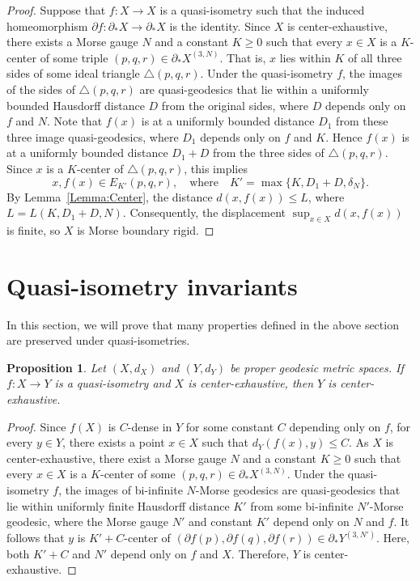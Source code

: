 \documentclass[a4paper,11pt,oneside]{article}
\newtheorem{Proposition}[Theorem]{Proposition}
\begin{document}
\begin{proof}
Suppose that $f: X\to X$ is a quasi-isometry such that the induced homeomorphism $\partial f:\partial_*X\to\partial_*X$ is the identity. 
Since $X$ is center-exhaustive, there exists a Morse gauge $N$ and a constant $K\ge0$ such that every $x\in X$ is a $K$-center of some triple $(p,q,r)\in\partial_*X^{(3, N)}$. That is, $x$ lies within $K$ of all three sides of some ideal triangle $\triangle(p, q, r)$. Under the quasi-isometry \( f \), the images of the sides of \( \triangle(p,q,r) \) are quasi-geodesics that lie within a uniformly bounded Hausdorff distance $D$ from the original sides, where $D$ depends only on $f$ and $N$.
Note that \( f(x) \) is at a uniformly bounded distance $D_1$ from these three image quasi-geodesics, where $D_1$ depends only on $f$ and $K$. Hence  \( f(x) \) is at a uniformly bounded distance $D_1+D$ from the three sides of \( \triangle(p,q,r) \). Since \( x \) is a \( K \)-center of \( \triangle(p,q,r) \), this implies 
\[
x, f(x)\in E_{K'}(p, q, r), \quad\text{where}\quad K'=\max\{K, D_1+D, \delta_N\}.
\]
By Lemma~\ref{Lemma:Center}, the distance $d(x, f(x))\le L$, where $L=L(K, D_1+D, N)$. 
Consequently, the displacement \( \sup_{x \in X} d(x, f(x)) \) is finite, so \( X \) is Morse boundary rigid. 
\end{proof}



\section{Quasi-isometry invariants}
In this section, we will prove that many properties defined in the above section are preserved under quasi-isometries.

\begin{Proposition}
     Let $(X, d_X)$ and $(Y, d_Y)$ be proper geodesic metric spaces. If $f: X \to Y$ is a quasi-isometry and $X$ is center-exhaustive, then $Y$ is center-exhaustive.
\end{Proposition}

\begin{proof}
   Since $f(X)$ is $C$-dense in $Y$ for some constant $C$ depending only on $f$, for every $y\in Y$, there exists a point $x\in X$ such that $d_Y(f(x), y)\le C$.
   As $X$ is center-exhaustive, there exist a Morse gauge $N$ and a constant $K\ge 0$ such that every $x\in X$ is a $K$-center of some $(p,q,r)\in\partial_*X^{(3,N)}$. Under the quasi-isometry $f$, the images of bi-infinite $N$-Morse geodesics are quasi-geodesics that lie within uniformly finite Hausdorff distance $K'$ from some bi-infinite $N'$-Morse geodesic, where the Morse gauge $N'$ and constant $K'$ depend only on $N$ and $f$. It follows that $y$ is $K'+C$-center of $(\partial f(p), \partial f(q), \partial f(r))\in \partial_*Y^{(3, N')}$. Here, both $K'+C$ and $N'$ depend only on $f$ and $X$. Therefore, $Y$ is center-exhaustive.
   
\end{proof}
\end{document}
